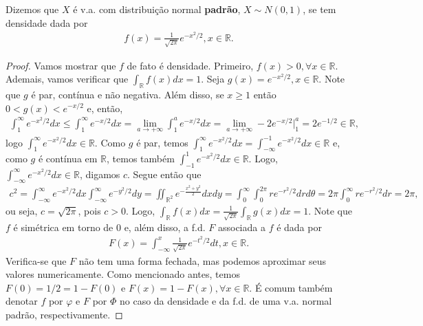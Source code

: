 \documentclass[../Notas.tex]{subfiles}
\begin{document}
\begin{example}
Dizemos que $X$ é v.a. com distribuição normal \textbf{padrão}, $X\sim N(0,1)$, se tem densidade dada por
\begin{align*}
    f(x) = \frac{1}{\sqrt{2\pi}}e^{-x^2/2}, x\in\mathbb{R}.
\end{align*}
\begin{proof}
Vamos mostrar que $f$ de fato é densidade. Primeiro, $f(x) > 0, \forall x\in\mathbb{R}$. Ademais, vamos verificar que $\displaystyle{ \int_{\mathbb{R}} f(x) dx = 1 }$. Seja $g(x) = e^{-x^2/2}, x\in\mathbb{R}$. Note que $g$ é par, contínua e não negativa. Além disso, se $x\geq 1$ então $0 < g(x) < e^{-x/2}$ e, então,
\begin{align*}
    \int_{1}^{\infty} e^{-x^2/2} dx \leq \int_{1}^{\infty} e^{-x/2} dx = \lim_{a\to +\infty} \int_{1}^{a} e^{-x/2} dx = \lim_{a\to +\infty} -2e^{-x/2}\Big|_{1}^a = 2e^{-1/2}\in\mathbb{R},
\end{align*}
logo $\displaystyle{ \int_{1}^{\infty} e^{-x^2/2} dx \in\mathbb{R}}$. Como $g$ é par, temos $\displaystyle{ \int_{1}^{\infty} e^{-x^2/2} dx = \int_{-\infty}^{-1} e^{-x^2/2} dx \in\mathbb{R}}$ e, como $g$ é contínua em $\mathbb{R}$, temos também $\displaystyle{ \int_{-1}^{1} e^{-x^2/2} dx \in\mathbb{R}}$. Logo, $\displaystyle{ \int_{-\infty}^{\infty} e^{-x^2/2} dx \in\mathbb{R}}$, digamos $c$. Segue então que
\begin{align*}
    c^2 = \int_{-\infty}^{\infty} e^{-x^2/2} dx\int_{-\infty}^{\infty} e^{-y^2/2} dy = \iint_{\mathbb{R}^2} e^{-\frac{x^2+y^2}{2}} dxdy = \int_{0}^{\infty}\int_{0}^{2\pi} re^{-r^2/2} drd\theta = 2\pi \int_{0}^{\infty} re^{-r^2/2} dr = 2\pi,
\end{align*}
ou seja, $c = \sqrt{2\pi}$, pois $c>0$. Logo, $\displaystyle{ \int_{\mathbb{R}} f(x) dx = \frac{1}{\sqrt{2\pi}} \int_{\mathbb{R}} g(x) dx = 1.}$ Note que $f$ é simétrica em torno de 0 e, além disso, a f.d. $F$ associada a $f$ é dada por
\begin{align*}
    F(x) = \int_{-\infty}^x \frac{1}{\sqrt{2\pi}} e^{-t^2/2} dt, x\in\mathbb{R}.
\end{align*}
Verifica-se que $F$ não tem uma forma fechada, mas podemos aproximar seus valores numericamente. Como mencionado antes, temos $F(0) = 1/2 = 1 - F(0)$ e $F(x) = 1 - F(x), \forall x\in\mathbb{R}$. É comum também denotar $f$ por $\varphi$ e $F$ por $\Phi$ no caso da densidade e da f.d. de uma v.a. normal padrão, respectivamente.
\end{proof}
\begin{remark}

\end{remark}
\end{example}
\end{document}

